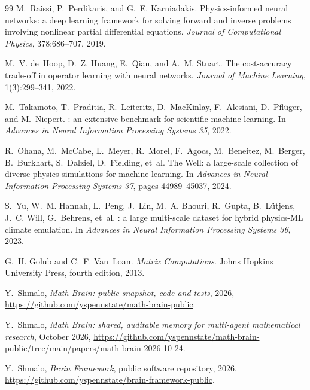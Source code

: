 \begin{thebibliography}{99}
M.~Raissi, P.~Perdikaris, and G.~E. Karniadakis.
\newblock Physics-informed neural networks: a deep learning framework for solving forward and
inverse problems involving nonlinear partial differential equations.
\newblock \emph{Journal of Computational Physics}, 378:686--707, 2019.

M.~V. de~Hoop, D.~Z. Huang, E.~Qian, and A.~M. Stuart.
\newblock The cost-accuracy trade-off in operator learning with neural networks.
\newblock \emph{Journal of Machine Learning}, 1(3):299--341, 2022.

M.~Takamoto, T.~Praditia, R.~Leiteritz, D.~MacKinlay, F.~Alesiani, D.~Pfl\"uger, and
M.~Niepert.
: an extensive benchmark for scientific machine learning.
\newblock In \emph{Advances in Neural Information Processing Systems 35}, 2022.

R.~Ohana, M.~McCabe, L.~Meyer, R.~Morel, F.~Agocs, M.~Beneitez, M.~Berger, B.~Burkhart,
S.~Dalziel, D.~Fielding, et~al.
\newblock The Well: a large-scale collection of diverse physics simulations for machine
learning.
\newblock In \emph{Advances in Neural Information Processing Systems 37}, pages
44989--45037, 2024.

S.~Yu, W.~M. Hannah, L.~Peng, J.~Lin, M.~A. Bhouri, R.~Gupta, B.~L\"utjens, J.~C. Will,
G.~Behrens, et~al.
: a large multi-scale dataset for hybrid physics-{ML} climate emulation.
\newblock In \emph{Advances in Neural Information Processing Systems 36}, 2023.

G.~H. Golub and C.~F. Van~Loan.
\newblock \emph{Matrix Computations}.
\newblock Johns Hopkins University Press, fourth edition, 2013.

 Y.~Shmalo, \emph{Math Brain: public snapshot, code and tests}, 2026, \url{https://github.com/yspennstate/math-brain-public}.

 Y.~Shmalo, \emph{Math Brain: shared, auditable memory for multi-agent mathematical research}, October 2026, \url{https://github.com/yspennstate/math-brain-public/tree/main/papers/math-brain-2026-10-24}.

 Y.~Shmalo, \emph{Brain Framework}, public software repository, 2026, \url{https://github.com/yspennstate/brain-framework-public}.

\end{thebibliography}
